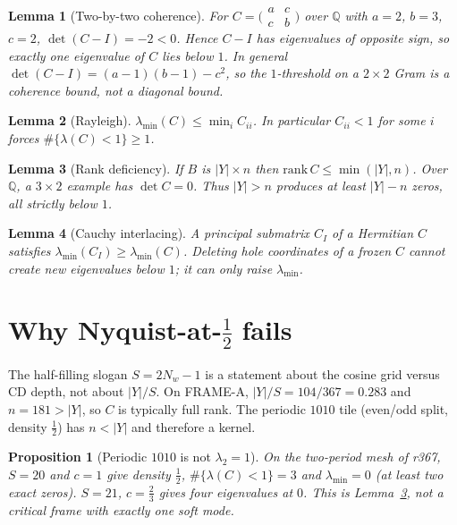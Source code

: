 \documentclass[11pt]{article}
\newtheorem{lemma}{Lemma}
\newtheorem{prop}{Proposition}
\theoremstyle{remark}
\begin{document}
\begin{lemma}[Two-by-two coherence]\label{lem:coh}
For $C=\bigl(\begin{smallmatrix}a&c\\c&b\end{smallmatrix}\bigr)$
over $\mathbb{Q}$ with $a=2$, $b=3$, $c=2$,
$\det(C-I)=-2<0$.
Hence $C-I$ has eigenvalues of opposite sign, so exactly one
eigenvalue of $C$ lies below $1$.
In general $\det(C-I)=(a-1)(b-1)-c^2$, so the $1$-threshold
on a $2\times 2$ Gram is a coherence bound, not a diagonal
bound.
\end{lemma}

\begin{lemma}[Rayleigh]\label{lem:rayleigh}
$\lambda_{\min}(C)\le\min_i C_{ii}$.
In particular $C_{ii}<1$ for some $i$ forces
$\#\{\lambda(C)<1\}\ge 1$.
\end{lemma}

\begin{lemma}[Rank deficiency]\label{lem:rank}
If $B$ is $|Y|\times n$ then $\mathrm{rank}\,C\le\min(|Y|,n)$.
Over $\mathbb{Q}$, a $3\times 2$ example has $\det C=0$.
Thus $|Y|>n$ produces at least $|Y|-n$ zeros, all strictly
below $1$.
\end{lemma}

\begin{lemma}[Cauchy interlacing]\label{lem:cauchy}
A principal submatrix $C_I$ of a Hermitian $C$ satisfies
$\lambda_{\min}(C_I)\ge\lambda_{\min}(C)$.
Deleting hole coordinates of a \emph{frozen} $C$ cannot
create new eigenvalues below $1$; it can only raise
$\lambda_{\min}$.
\end{lemma}

\section{Why Nyquist-at-$\tfrac12$ fails}\label{sec:no}

The half-filling slogan $S=2N_w-1$ is a statement about the
cosine grid versus CD depth, not about $|Y|/S$.
On FRAME-A, $|Y|/S=104/367=0.283$ and $n=181>|Y|$, so $C$ is
typically full rank.
The periodic $1010$ tile (even/odd split, density $\tfrac12$)
has $n<|Y|$ and therefore a kernel.

\begin{prop}[Periodic $1010$ is not $\lambda_2=1$]\label{prop:1010}
On the two-period mesh of r367, $S=20$ and $c=1$ give
density $\tfrac12$, $\#\{\lambda(C)<1\}=3$ and
$\lambda_{\min}=0$ (at least two exact zeros).
$S=21$, $c=\tfrac23$ gives four eigenvalues at $0$.
This is Lemma~\ref{lem:rank}, not a critical frame with
exactly one soft mode.
\end{prop}
\end{document}
